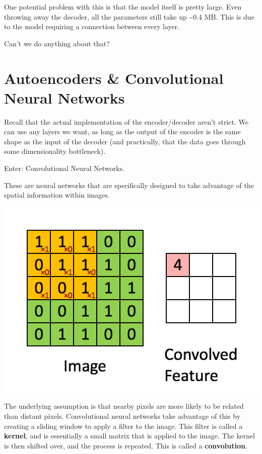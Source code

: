 \documentclass[11pt]{article}
\begin{document}
One potential problem with this is that the model itself is pretty
large. Even throwing away the decoder, all the parameters still take up
\textasciitilde{}0.4 MB. This is due to the model requiring a connection
between every layer.

Can't we do anything about that?

\hypertarget{autoencoders-convolutional-neural-networks}{%
    \section{Autoencoders \& Convolutional Neural
      Networks}\label{autoencoders-convolutional-neural-networks}}

Recall that the actual implementation of the encoder/decoder aren't
strict. We can use any layers we want, as long as the output of the
encoder is the same shape as the input of the decoder (and practically,
that the data goes through some dimensionality bottleneck).

Enter: Convolutional Neural Networks.

These are neural networks that are specifically designed to take
advantage of the spatial information within images.

\includegraphics{./figures/cnn.png}

The underlying assumption is that nearby pixels are more likely to be
related than distant pixels. Convolutional neural networks take
advantage of this by creating a sliding window to apply a filter to the
image. This filter is called a \textbf{kernel}, and is essentially a
small matrix that is applied to the image. The kernel is then shifted
over, and the process is repeated. This is called a
\textbf{convolution}.
\end{document}
